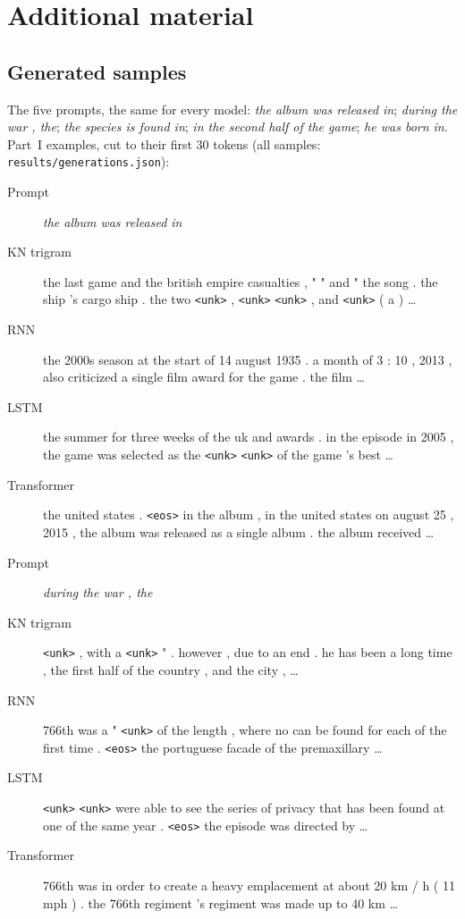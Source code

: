 \documentclass[10pt]{article}
\newcommand{\tok}[1]{\texttt{#1}}
\begin{document}
\clearpage
\appendix
\section{Additional material}

\subsection{Generated samples}\label{app:samples}
The five prompts, the same for every model: \emph{the album was released in}; \emph{during the war , the}; \emph{the species is found in}; \emph{in the second half of the game}; \emph{he was born in}. Part~I examples, cut to their first 30 tokens (all samples: \tok{results/generations.json}):

\begin{small}
\begin{description}
\item[Prompt] \emph{the album was released in}
\item[KN trigram] the last game and the british empire casualties , " " and " the song . the ship 's cargo ship . the two \tok{<unk>} , \tok{<unk>} \tok{<unk>} , and \tok{<unk>} ( a ) \dots
\item[RNN] the 2000s season at the start of 14 august 1935 . a month of 3 : 10 , 2013 , also criticized a single film award for the game . the film \dots
\item[LSTM] the summer for three weeks of the uk and awards . in the episode in 2005 , the game was selected as the \tok{<unk>} \tok{<unk>} of the game 's best \dots
\item[Transformer] the united states . \tok{<eos>} in the album , in the united states on august 25 , 2015 , the album was released as a single album . the album received \dots
\item[Prompt] \emph{during the war , the}
\item[KN trigram] \tok{<unk>} , with a \tok{<unk>} " . however , due to an end . he has been a long time , the first half of the country , and the city , \dots
\item[RNN] 766th was a " \tok{<unk>} of the length , where no can be found for each of the first time . \tok{<eos>} the portuguese facade of the premaxillary \dots
\item[LSTM] \tok{<unk>} \tok{<unk>} were able to see the series of privacy that has been found at one of the same year . \tok{<eos>} the episode was directed by \dots
\item[Transformer] 766th was in order to create a heavy emplacement at about 20 km / h ( 11 mph ) . the 766th regiment 's regiment was made up to 40 km \dots
\end{description}
\end{small}
\end{document}
